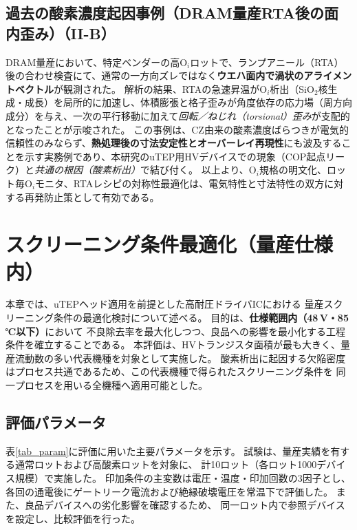 \documentclass[twocolumn]{ieeetran}
\begin{document}
\subsection{過去の酸素濃度起因事例（DRAM量産RTA後の面内歪み）（II-B）}\label{sec:DRAMcase}
DRAM量産において、特定ベンダーの高O$_i$ロットで、ランプアニール（RTA）後の合わせ検査にて、通常の一方向ズレではなく\textbf{ウエハ面内で渦状のアライメントベクトル}が観測された。
解析の結果、RTAの急速昇温がO$_i$析出（SiO$_2$核生成・成長）を局所的に加速し、体積膨張と格子歪みが角度依存の応力場（周方向成分）を与え、一次の平行移動に加えて\textit{回転／ねじれ（torsional）歪み}が支配的となったことが示唆された。
この事例は、CZ由来の酸素濃度ばらつきが電気的信頼性のみならず、\textbf{熱処理後の寸法安定性とオーバーレイ再現性}にも波及することを示す実務例であり、本研究のuTEP用HVデバイスでの現象（COP起点リーク）と\textit{共通の根因（酸素析出）}で結び付く。
以上より、O$_i$規格の明文化、ロット毎O$_i$モニタ、RTAレシピの対称性最適化は、電気特性と寸法特性の双方に対する再発防止策として有効である。

\section{スクリーニング条件最適化（量産仕様内）}

本章では、uTEPヘッド適用を前提とした高耐圧ドライバICにおける
量産スクリーニング条件の最適化検討について述べる。
目的は、\textbf{仕様範囲内（48\,V・85\,℃以下）}において
不良除去率を最大化しつつ、良品への影響を最小化する工程条件を確立することである。
本評価は、HVトランジスタ面積が最も大きく、量産流動数の多い代表機種を対象として実施した。
酸素析出に起因する欠陥密度はプロセス共通であるため、この代表機種で得られたスクリーニング条件を
同一プロセスを用いる全機種へ適用可能とした。

\subsection{評価パラメータ}

表\ref{tab_param}に評価に用いた主要パラメータを示す。
試験は、量産実績を有する通常ロットおよび高酸素ロットを対象に、
計10ロット（各ロット1000デバイス規模）で実施した。
印加条件の主変数は電圧・温度・印加回数の3因子とし、
各回の通電後にゲートリーク電流および絶縁破壊電圧を常温下で評価した。
また、良品デバイスへの劣化影響を確認するため、
同一ロット内で参照デバイスを設定し、比較評価を行った。
\end{document}
